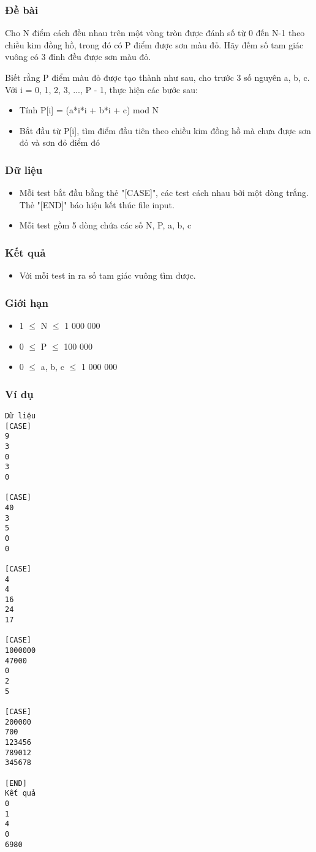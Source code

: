 



\subsubsection{   Đề bài  }

   Cho N điểm cách đều nhau trên một vòng tròn được đánh số từ 0 đến N-1 theo chiều kim đồng hồ, trong đó có P điểm được sơn màu đỏ. Hãy đếm số tam giác vuông có 3 đỉnh đều được sơn màu đỏ.  

   Biết rằng P điểm màu đỏ được tạo thành như sau, cho trước 3 số nguyên a, b, c. Với i = 0, 1, 2, 3, ..., P - 1, thực hiện các bước sau:  
\begin{itemize}
	\item     Tính P[i] = (a*i*i + b*i + c) mod N   
	\item     Bắt đầu từ P[i], tìm điểm đầu tiên theo chiều kim đồng hồ mà chưa được sơn đỏ và sơn đỏ điểm đó   
\end{itemize}

\subsubsection{   Dữ liệu  }
\begin{itemize}
	\item     Mỗi test bắt đầu bằng thẻ "[CASE]", các test cách nhau bởi một dòng trắng. Thẻ "[END]" báo hiệu kết thúc file input.   
	\item     Mỗi test gồm 5 dòng chứa các số N, P, a, b, c   
\end{itemize}

\subsubsection{   Kết quả  }
\begin{itemize}
	\item     Với mỗi test in ra số tam giác vuông tìm được.   
\end{itemize}

\subsubsection{   Giới hạn  }
\begin{itemize}
	\item     1  $\le$  N  $\le$  1 000 000   
	\item     0  $\le$  P  $\le$  100 000   
	\item     0  $\le$  a, b, c  $\le$  1 000 000   
\end{itemize}

\subsubsection{   Ví dụ  }
\begin{verbatim}
Dữ liệu
[CASE]
9
3
0
3
0

[CASE]
40
3
5
0
0

[CASE]
4
4
16
24
17
    	
[CASE]
1000000
47000
0
2
5

[CASE]
200000
700
123456
789012
345678

[END]
Kết quả
0
1
4
0
6980
\end{verbatim}
